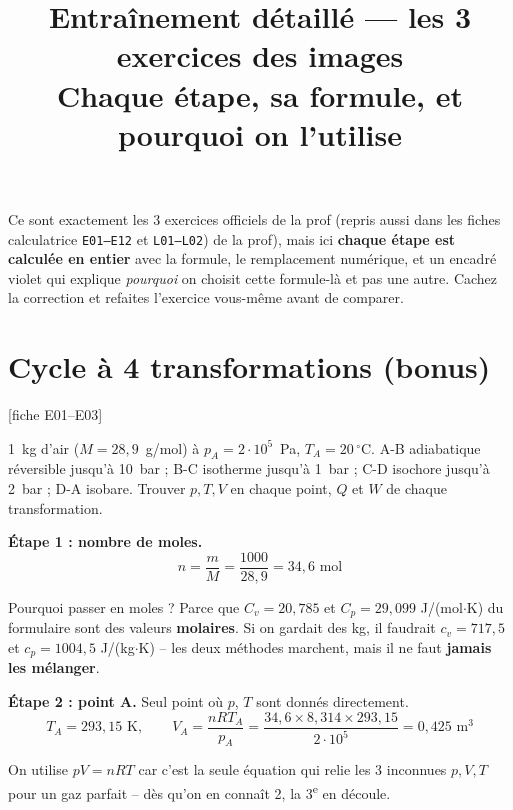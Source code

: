 \documentclass[11pt,a4paper]{article}
\title{\textbf{Entraînement détaillé --- les 3 exercices des images}\\[3pt]
\large Chaque étape, sa formule, et pourquoi on l'utilise}
\author{}
\date{}
\newcommand{\fiche}[1]{\hfill{\small\color{cgris}[fiche #1]}}
\begin{document}
\maketitle
\vspace{-0.9cm}

\begin{info}
Ce sont exactement les 3 exercices officiels de la prof (repris aussi dans les fiches calculatrice \texttt{E01--E12} et \texttt{L01--L02})
de la prof), mais ici \textbf{chaque étape est calculée en entier} avec la formule, le remplacement
numérique, et un encadré violet qui explique \textit{pourquoi} on choisit cette formule-là et pas une
autre. Cachez la correction et refaites l'exercice vous-même avant de comparer.
\end{info}

\tableofcontents
\newpage

\section{Cycle à 4 transformations (bonus)}
\fiche{E01--E03}

\begin{enonce}
1~kg d'air ($M=28{,}9$~g/mol) à $p_A=2\cdot10^5$~Pa, $T_A=20\,^\circ$C. A-B adiabatique réversible
jusqu'à 10~bar ; B-C isotherme jusqu'à 1~bar ; C-D isochore jusqu'à 2~bar ; D-A isobare. Trouver
$p,T,V$ en chaque point, $Q$ et $W$ de chaque transformation.
\end{enonce}

\begin{calc}
\textbf{Étape 1 : nombre de moles.}
\[ n=\frac{m}{M}=\frac{1000}{28{,}9}=34{,}6\text{ mol} \]
\end{calc}
\begin{pourquoi}
Pourquoi passer en moles ? Parce que $C_v=20{,}785$ et $C_p=29{,}099$ J/(mol$\cdot$K) du formulaire
sont des valeurs \textbf{molaires}. Si on gardait des kg, il faudrait $c_v=717{,}5$ et $c_p=1004{,}5$
J/(kg$\cdot$K) -- les deux méthodes marchent, mais il ne faut \textbf{jamais les mélanger}.
\end{pourquoi}

\begin{calc}
\textbf{Étape 2 : point A.} Seul point où $p$, $T$ sont donnés directement.
\[ T_A = 293{,}15\text{ K},\qquad V_A=\frac{nRT_A}{p_A}=\frac{34{,}6\times8{,}314\times293{,}15}{2\cdot10^5}
= 0{,}425\text{ m}^3 \]
\end{calc}
\begin{pourquoi}
On utilise $pV=nRT$ car c'est la seule équation qui relie les 3 inconnues $p,V,T$ pour un gaz
parfait -- dès qu'on en connaît 2, la 3\textsuperscript{e} en découle.
\end{pourquoi}
\end{document}
